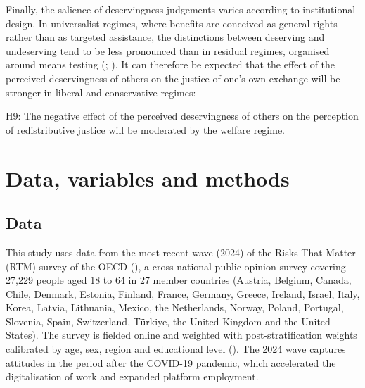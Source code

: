 \documentclass[
  12pt,
]{article}
\begin{document}
Finally, the salience of deservingness judgements varies according to
institutional design. In universalist regimes, where benefits are
conceived as general rights rather than as targeted assistance, the
distinctions between deserving and undeserving tend to be less
pronounced than in residual regimes, organised around means testing
(;
). It
can therefore be expected that the effect of the perceived deservingness
of others on the justice of one's own exchange will be stronger in
liberal and conservative regimes:

\begin{tcolorbox}[enhanced jigsaw, arc=.35mm, bottomrule=.15mm, breakable, colback=white, colframe=quarto-callout-color-frame, left=2mm, leftrule=.75mm, opacityback=0, rightrule=.15mm, toprule=.15mm]

H9: The negative effect of the perceived deservingness of others on the
perception of redistributive justice will be moderated by the welfare
regime.

\end{tcolorbox}

\section{Data, variables and methods}\label{data-variables-and-methods}

\subsection{Data}\label{data}

This study uses data from the most recent wave (2024) of the Risks That
Matter (RTM) survey of the OECD (), a cross-national public opinion survey covering 27,229 people
aged 18 to 64 in 27 member countries (Austria, Belgium, Canada, Chile,
Denmark, Estonia, Finland, France, Germany, Greece, Ireland, Israel,
Italy, Korea, Latvia, Lithuania, Mexico, the Netherlands, Norway,
Poland, Portugal, Slovenia, Spain, Switzerland, Türkiye, the United
Kingdom and the United States). The survey is fielded online and
weighted with post-stratification weights calibrated by age, sex, region
and educational level (). The 2024 wave captures attitudes in the period after the
COVID-19 pandemic, which accelerated the digitalisation of work and
expanded platform employment.
\end{document}
